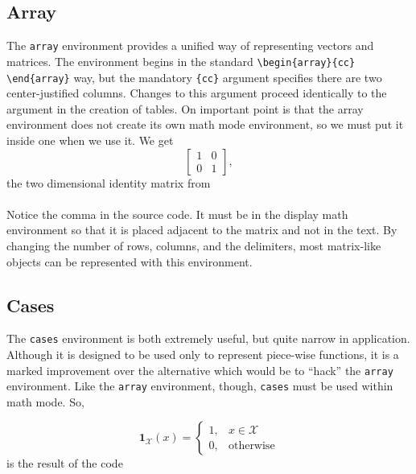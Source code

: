 \subsection*{Array}
The \texttt{array} environment provides a unified way of representing
vectors and matrices. The environment begins in the standard
\verb!\begin{array}{cc} \end{array}! way, but the mandatory
\verb!{cc}! argument specifies there are two center-justified
columns. Changes to this argument proceed identically to the argument
in the creation of tables. On important point is that the array
environment does not create its own math mode environment, so we must
put it inside one when we use it. We get \[ \left[\begin{array}{cc} 1 & 0 \\
    0 & 1\end{array}\right], \] the two dimensional identity matrix
from \\
\ovalbox{
    \begin{minipage}{\linewidth}
\begin{verbatim}
\[
 \left[
\begin{array}{cc} 
  1 & 0 \\
  0 & 1
\end{array}
\right],
\]
\end{verbatim}
    \end{minipage}
  } \\ Notice the comma in the source code. It must be in the display
  math environment so that it is placed adjacent to the matrix and not
  in the text. By changing the number of rows, columns, and the
  delimiters, most matrix-like objects can be represented with this
  environment.

\subsection*{Cases}

The \texttt{cases} environment is both extremely useful, but quite
narrow in application. Although it is designed to be used only to
represent piece-wise functions, it is a marked improvement over the
alternative which would be to ``hack'' the \texttt{array}
environment. Like the \texttt{array} environment, though,
\texttt{cases} must be used within math mode. So, 

\[
\mathbf{1}_{\mathcal{X}}(x) = 
\begin{cases}
  1, & x \in \mathcal{X} \\
  0, & \textrm{otherwise}
\end{cases}
\]
is the result of the code

